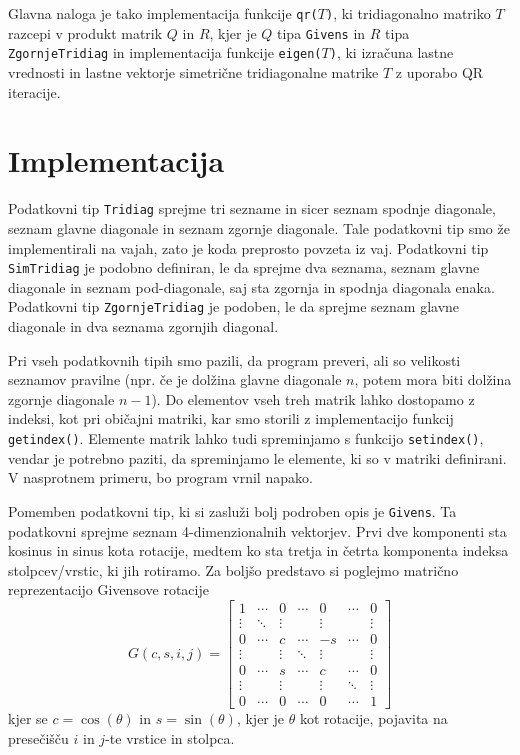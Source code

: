 \documentclass[11pt, titlepage]{article}
\begin{document}
Glavna naloga je tako implementacija funkcije \texttt{qr($T$)}, ki tridiagonalno matriko $T$ razcepi v produkt matrik $Q$ in $R$, kjer je $Q$ tipa \texttt{Givens} in $R$ tipa \texttt{ZgornjeTridiag} in
implementacija funkcije \texttt{eigen($T$)}, ki izračuna lastne vrednosti in lastne vektorje simetrične tridiagonalne matrike $T$ z uporabo QR iteracije.

\section{Implementacija}
Podatkovni tip \texttt{Tridiag} sprejme tri sezname in sicer seznam spodnje diagonale, seznam glavne diagonale in seznam zgornje diagonale.
Tale podatkovni tip smo že implementirali na vajah, zato je koda preprosto povzeta iz vaj. Podatkovni tip \texttt{SimTridiag} je podobno definiran, le da sprejme dva seznama, seznam glavne diagonale in seznam pod-diagonale, 
saj sta zgornja in spodnja diagonala enaka. Podatkovni tip \texttt{ZgornjeTridiag} je podoben, le da sprejme seznam glavne diagonale in dva seznama zgornjih diagonal.

Pri vseh podatkovnih tipih smo pazili, da program preveri, ali so velikosti seznamov pravilne (npr. če je dolžina glavne diagonale $n$, potem mora biti dolžina zgornje diagonale $n-1$).
Do elementov vseh treh matrik lahko dostopamo z indeksi, kot pri običajni matriki, kar smo storili z implementacijo funkcij \texttt{getindex()}. Elemente matrik lahko tudi spreminjamo s funkcijo \texttt{setindex()},
vendar je potrebno paziti, da spreminjamo le elemente, ki so v matriki definirani. V nasprotnem primeru, bo program vrnil napako.

Pomemben podatkovni tip, ki si zasluži bolj podroben opis je \texttt{Givens}. Ta podatkovni sprejme seznam 4-dimenzionalnih vektorjev. Prvi dve komponenti sta kosinus in sinus kota rotacije, medtem ko sta tretja in četrta komponenta
indeksa stolpcev/vrstic, ki jih rotiramo. Za boljšo predstavo si poglejmo matrično reprezentacijo Givensove rotacije
\[
G(c,s,i,j) =
\begin{bmatrix}
1      & \cdots & 0      & \cdots & 0      & \cdots & 0      \\
\vdots & \ddots & \vdots &        & \vdots &        & \vdots \\
0      & \cdots & c      & \cdots & -s     & \cdots & 0      \\
\vdots &        & \vdots & \ddots & \vdots &        & \vdots \\
0      & \cdots & s      & \cdots & c      & \cdots & 0      \\
\vdots &        & \vdots &        & \vdots & \ddots & \vdots \\
0      & \cdots & 0      & \cdots & 0      & \cdots & 1      
\end{bmatrix}
\]
kjer se $c = \cos(\theta)$ in $s = \sin(\theta)$, kjer je $\theta$ kot rotacije, pojavita na presečišču $i$ in $j$-te vrstice in stolpca.
\end{document}
